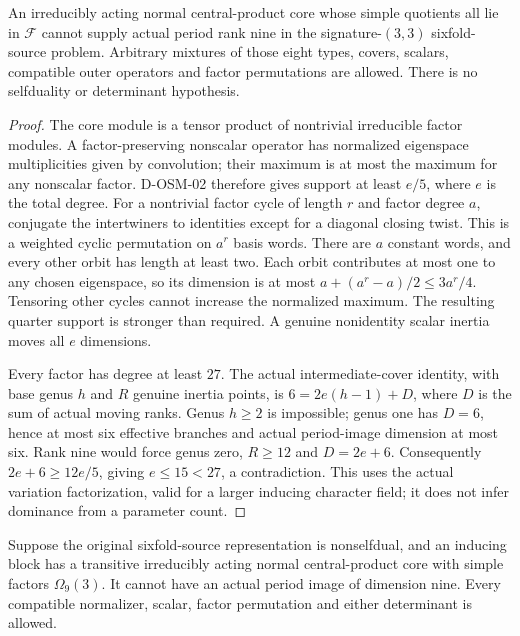 \begin{theorem}
\label{D-OSM-03}
An irreducibly acting normal central-product core whose simple
quotients all lie in $\mathcal F$ cannot supply actual period rank
nine in the signature-$(3,3)$ sixfold-source problem. Arbitrary
mixtures of those eight types, covers, scalars, compatible outer
operators and factor permutations are allowed. There is no
selfduality or determinant hypothesis.
\end{theorem}

\begin{proof}
The core module is a tensor product of nontrivial irreducible factor
modules. A factor-preserving nonscalar operator has normalized
eigenspace multiplicities given by convolution; their maximum is at
most the maximum for any nonscalar factor. D-OSM-02 therefore gives
support at least $e/5$, where $e$ is the total degree.
For a nontrivial factor cycle of length $r$ and factor degree $a$,
conjugate the intertwiners to identities except for a diagonal closing
twist. This is a weighted cyclic permutation on $a^r$ basis words.
There are $a$ constant words, and every other orbit has length at
least two. Each orbit contributes at most one to any chosen
eigenspace, so its dimension is at most
$a+(a^r-a)/2\le3a^r/4$. Tensoring other cycles cannot increase
the normalized maximum. The resulting quarter support is stronger
than required. A genuine nonidentity scalar inertia moves all $e$
dimensions.

Every factor has degree at least $27$. The actual intermediate-cover
identity, with base genus $h$ and $R$ genuine inertia points, is
$6=2e(h-1)+D$, where $D$ is the sum of actual moving ranks.
Genus $h\ge2$ is impossible; genus one has $D=6$, hence at most six
effective branches and actual period-image dimension at most six.
Rank nine would force genus zero, $R\ge12$ and $D=2e+6$.
Consequently $2e+6\ge12e/5$, giving $e\le15<27$, a contradiction.
This uses the actual variation factorization, valid for a larger
inducing character field; it does not infer dominance from a parameter
count.
\end{proof}

\begin{theorem}
\label{D-OSM-04}
Suppose the original sixfold-source representation is nonselfdual,
and an inducing block has a transitive irreducibly acting normal
central-product core with simple factors $\Omega_9(3)$. It cannot
have an actual period image of dimension nine. Every compatible
normalizer, scalar, factor permutation and either determinant is allowed.
\end{theorem}

